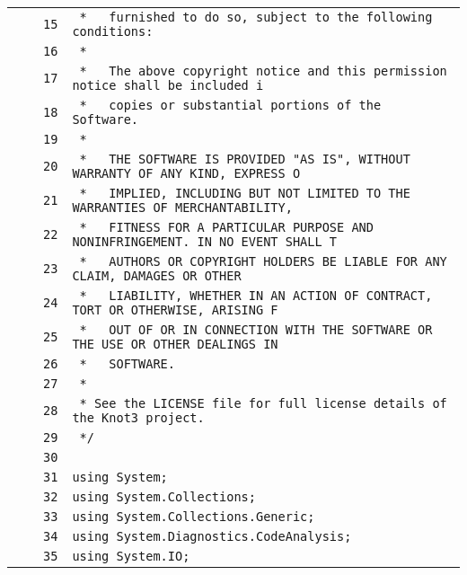 \documentclass[a4paper,10pt]{article}
\begin{document}
\begin{longtable}[l]{lrrl}
\cellcolor{gray} &  & \verb~15~ & \verb~ *   furnished to do so, subject to the following conditions:~\\
\cellcolor{gray} &  & \verb~16~ & \verb~ *~\\
\cellcolor{gray} &  & \verb~17~ & \verb~ *   The above copyright notice and this permission notice shall be included i~\\
\cellcolor{gray} &  & \verb~18~ & \verb~ *   copies or substantial portions of the Software.~\\
\cellcolor{gray} &  & \verb~19~ & \verb~ *~\\
\cellcolor{gray} &  & \verb~20~ & \verb~ *   THE SOFTWARE IS PROVIDED "AS IS", WITHOUT WARRANTY OF ANY KIND, EXPRESS O~\\
\cellcolor{gray} &  & \verb~21~ & \verb~ *   IMPLIED, INCLUDING BUT NOT LIMITED TO THE WARRANTIES OF MERCHANTABILITY,~\\
\cellcolor{gray} &  & \verb~22~ & \verb~ *   FITNESS FOR A PARTICULAR PURPOSE AND NONINFRINGEMENT. IN NO EVENT SHALL T~\\
\cellcolor{gray} &  & \verb~23~ & \verb~ *   AUTHORS OR COPYRIGHT HOLDERS BE LIABLE FOR ANY CLAIM, DAMAGES OR OTHER~\\
\cellcolor{gray} &  & \verb~24~ & \verb~ *   LIABILITY, WHETHER IN AN ACTION OF CONTRACT, TORT OR OTHERWISE, ARISING F~\\
\cellcolor{gray} &  & \verb~25~ & \verb~ *   OUT OF OR IN CONNECTION WITH THE SOFTWARE OR THE USE OR OTHER DEALINGS IN~\\
\cellcolor{gray} &  & \verb~26~ & \verb~ *   SOFTWARE.~\\
\cellcolor{gray} &  & \verb~27~ & \verb~ *~\\
\cellcolor{gray} &  & \verb~28~ & \verb~ * See the LICENSE file for full license details of the Knot3 project.~\\
\cellcolor{gray} &  & \verb~29~ & \verb~ */~\\
\cellcolor{gray} &  & \verb~30~ & \verb~~\\
\cellcolor{gray} &  & \verb~31~ & \verb~using System;~\\
\cellcolor{gray} &  & \verb~32~ & \verb~using System.Collections;~\\
\cellcolor{gray} &  & \verb~33~ & \verb~using System.Collections.Generic;~\\
\cellcolor{gray} &  & \verb~34~ & \verb~using System.Diagnostics.CodeAnalysis;~\\
\cellcolor{gray} &  & \verb~35~ & \verb~using System.IO;~\\

\end{longtable}
\end{document}
